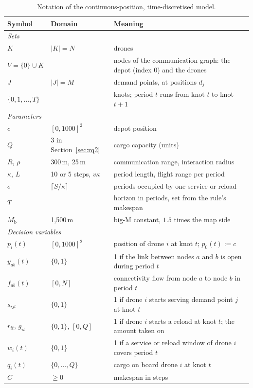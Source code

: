 \documentclass[final,5p,times,twocolumn]{elsarticle}
\begin{document}
\begin{table}[t]
\centering
\caption{Notation of the continuous-position, time-discretised model.}
\label{tab:notation}
\small
\begin{tabular}{llp{9.6cm}}
\toprule
Symbol & Domain & Meaning \\
\midrule
\multicolumn{3}{l}{\emph{Sets}} \\
$K$ & $|K| = N$ & drones \\
$V = \{0\} \cup K$ & & nodes of the communication graph: the depot (index 0) and the drones \\
$J$ & $|J| = M$ & demand points, at positions $d_j$ \\
$\{0, 1, \dots, T\}$ & & knots; period $t$ runs from knot $t$ to knot $t+1$ \\
\midrule
\multicolumn{3}{l}{\emph{Parameters}} \\
$c$ & $[0,1000]^2$ & depot position \\
$Q$ & 3 in Section~\ref{sec:rq2} & cargo capacity (units) \\
$R$, $\rho$ & 300\,m, 25\,m & communication range, interaction radius \\
$\kappa$, $L$ & 10 or 5 steps, $v\kappa$ & period length, flight range per period \\
$\sigma$ & $\lceil S/\kappa \rceil$ & periods occupied by one service or reload \\
$T$ & & horizon in periods, set from the rule's makespan \\
$M_{\mathrm{b}}$ & 1{,}500\,m & big-M constant, $1.5$ times the map side \\
\midrule
\multicolumn{3}{l}{\emph{Decision variables}} \\
$p_i(t)$ & $[0,1000]^2$ & position of drone $i$ at knot $t$; $p_0(t) := c$ \\
$y_{ab}(t)$ & $\{0,1\}$ & 1 if the link between nodes $a$ and $b$ is open during period $t$ \\
$f_{ab}(t)$ & $[0, N]$ & connectivity flow from node $a$ to node $b$ in period $t$ \\
$s_{ijt}$ & $\{0,1\}$ & 1 if drone $i$ starts serving demand point $j$ at knot $t$ \\
$r_{it}$, $g_{it}$ & $\{0,1\}$, $[0,Q]$ & 1 if drone $i$ starts a reload at knot $t$; the amount taken on \\
$w_i(t)$ & $\{0,1\}$ & 1 if a service or reload window of drone $i$ covers period $t$ \\
$q_i(t)$ & $\{0,\dots,Q\}$ & cargo on board drone $i$ at knot $t$ \\
$C$ & $\ge 0$ & makespan in steps \\
\bottomrule
\end{tabular}
\end{table}
\end{document}
